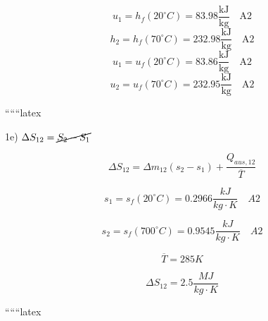 \[
u_1 = h_f (20^\circ C) = 83.98 \frac{\text{kJ}}{\text{kg}} \quad \text{A2}
\]
\[
h_2 = h_f (70^\circ C) = 232.98 \frac{\text{kJ}}{\text{kg}} \quad \text{A2}
\]
\[
u_1 = u_f (20^\circ C) = 83.86 \frac{\text{kJ}}{\text{kg}} \quad \text{A2}
\]
\[
u_2 = u_f (70^\circ C) = 232.95 \frac{\text{kJ}}{\text{kg}} \quad \text{A2}
\]

``````latex

1e) \(\Delta S_{12} = \cancel{\cancel{S_2 - S_1}}\)

\[
\Delta S_{12} = \Delta m_{12}(s_2 - s_1) + \frac{Q_{aus,12}}{\overline{T}}
\]

\[
s_1 = s_f(20^\circ C) = 0.2966 \frac{kJ}{kg \cdot K} \quad A2
\]

\[
s_2 = s_f(700^\circ C) = 0.9545 \frac{kJ}{kg \cdot K} \quad A2
\]

\[
\overline{T} = 285 K
\]

\[
\Delta S_{12} = 2.5 \frac{MJ}{kg \cdot K}
\]

``````latex


